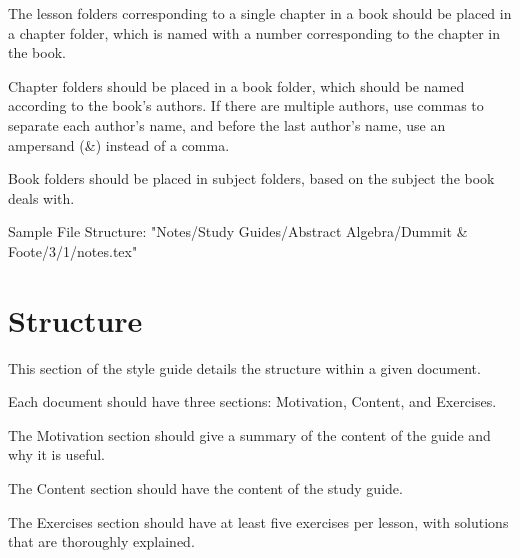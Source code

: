 \documentclass{article}
\begin{document}
The lesson folders corresponding to a single chapter in a book should be placed in a chapter folder, which is named with a number corresponding to the chapter in the book.

Chapter folders should be placed in a book folder, which should be named according to the book's authors. If there are multiple authors, use commas to separate each author's name, and before the last author's name, use an ampersand (\&) instead of a comma.

Book folders should be placed in subject folders, based on the subject the book deals with.

Sample File Structure: "Notes/Study Guides/Abstract Algebra/Dummit \& Foote/3/1/notes.tex"

\section{Structure}
This section of the style guide details the structure within a given document.

Each document should have three sections: Motivation, Content, and Exercises.

The Motivation section should give a summary of the content of the guide and why it is useful.

The Content section should have the content of the study guide.

The Exercises section should have at least five exercises per lesson, with solutions that are thoroughly explained.
\end{document}
